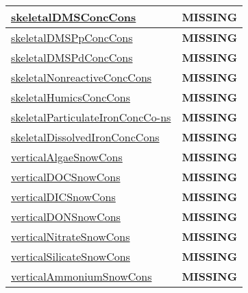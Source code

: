 {\begin{center}
\begin{longtable}{| p{2.0in} | p{4.0in} |}
    \hline
    \hyperref[subsec:var_sec_tracer_conservation_skeletalDMSConcCons]{skeletalDMSConcCons} & {\bf \color{red} MISSING} \\
    \hline
    \hyperref[subsec:var_sec_tracer_conservation_skeletalDMSPpConcCons]{skeletalDMSPpConcCons} & {\bf \color{red} MISSING} \\
    \hline
    \hyperref[subsec:var_sec_tracer_conservation_skeletalDMSPdConcCons]{skeletalDMSPdConcCons} & {\bf \color{red} MISSING} \\
    \hline
    \hyperref[subsec:var_sec_tracer_conservation_skeletalNonreactiveConcCons]{skeletalNonreactiveConcCons} & {\bf \color{red} MISSING} \\
    \hline
    \hyperref[subsec:var_sec_tracer_conservation_skeletalHumicsConcCons]{skeletalHumicsConcCons} & {\bf \color{red} MISSING} \\
    \hline
    \hyperref[subsec:var_sec_tracer_conservation_skeletalParticulateIronConcCons]{skeletalParticulateIronConcCo-}\hyperref[subsec:var_sec_tracer_conservation_skeletalParticulateIronConcCons]{ns  }& {\bf \color{red} MISSING} \\
    \hline
    \hyperref[subsec:var_sec_tracer_conservation_skeletalDissolvedIronConcCons]{skeletalDissolvedIronConcCons} & {\bf \color{red} MISSING} \\
    \hline
    \hyperref[subsec:var_sec_tracer_conservation_verticalAlgaeSnowCons]{verticalAlgaeSnowCons} & {\bf \color{red} MISSING} \\
    \hline
    \hyperref[subsec:var_sec_tracer_conservation_verticalDOCSnowCons]{verticalDOCSnowCons} & {\bf \color{red} MISSING} \\
    \hline
    \hyperref[subsec:var_sec_tracer_conservation_verticalDICSnowCons]{verticalDICSnowCons} & {\bf \color{red} MISSING} \\
    \hline
    \hyperref[subsec:var_sec_tracer_conservation_verticalDONSnowCons]{verticalDONSnowCons} & {\bf \color{red} MISSING} \\
    \hline
    \hyperref[subsec:var_sec_tracer_conservation_verticalNitrateSnowCons]{verticalNitrateSnowCons} & {\bf \color{red} MISSING} \\
    \hline
    \hyperref[subsec:var_sec_tracer_conservation_verticalSilicateSnowCons]{verticalSilicateSnowCons} & {\bf \color{red} MISSING} \\
    \hline
    \hyperref[subsec:var_sec_tracer_conservation_verticalAmmoniumSnowCons]{verticalAmmoniumSnowCons} & {\bf \color{red} MISSING} \\

\end{longtable}
\end{center}}
